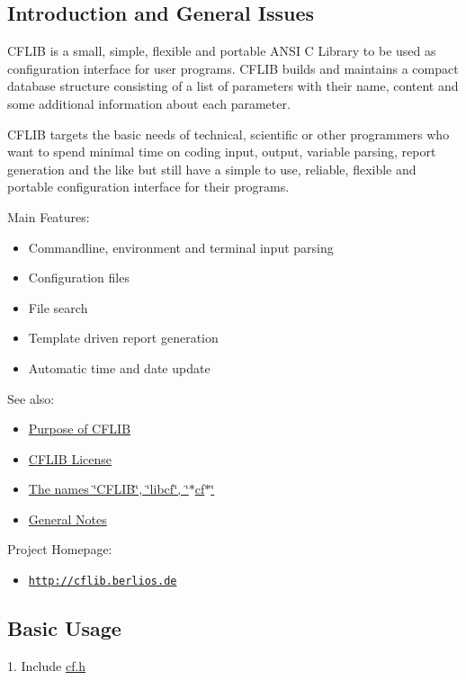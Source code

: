 \hypertarget{index_intro}{}\subsection{Introduction and General Issues}\label{index_intro}
CFLIB is a small, simple, flexible and portable ANSI C Library to be used as configuration interface for user programs. CFLIB builds and maintains a compact database structure consisting of a list of parameters with their name, content and some additional information about each parameter.

CFLIB targets the basic needs of technical, scientific or other programmers who want to spend minimal time on coding input, output, variable parsing, report generation and the like but still have a simple to use, reliable, flexible and portable configuration interface for their programs.

\begin{Desc}
\item[Main Features:]\end{Desc}
\begin{itemize}
\item Commandline, environment and terminal input parsing\item Configuration files\item File search\item Template driven report generation\item Automatic time and date update\end{itemize}


\begin{Desc}
\item[See also:]\begin{itemize}
\item \hyperlink{purpose}{Purpose of CFLIB}\item \hyperlink{license}{CFLIB License}\item \hyperlink{properties_names}{The names \char`\"{}CFLIB\char`\"{}, \char`\"{}libcf\char`\"{}, \char`\"{}$\ast$cf$\ast$\char`\"{}}\item \hyperlink{properties}{General Notes}\end{itemize}
\end{Desc}
\begin{Desc}
\item[Project Homepage:]\end{Desc}
\begin{itemize}
\item \href{http://cflib.berlios.de}{\tt http://cflib.berlios.de}\end{itemize}
\hypertarget{index_basic_usage}{}\subsection{Basic Usage}\label{index_basic_usage}
1. Include \hyperlink{cf_8h}{cf.h}

